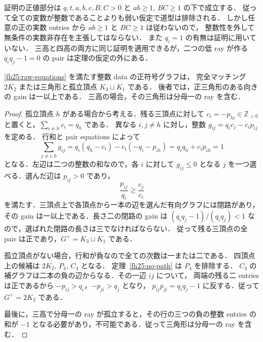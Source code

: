\begin{remark}[排除に必要な離散性]
\label{fh25:real-scope}
証明の正値部分は $q,t,a,b,c,B,C>0$ と $ab\ge1$, $BC\ge1$ の下で成立する．
従って全ての変数が整数であることよりも弱い仮定で道型は排除される．
しかし任意の正の実数 entries から $ab\ge1$ と $BC\ge1$ は従わないので，
整数性を外して無条件の実数非存在を主張してはならない．
また $q_i=1$ の有無は証明に用いていない．
三高と四高の両方に同じ証明を適用できるが，二つの低 ray が作る
$q_iq_j-1=0$ の pair は定理の仮定の外にある．
\end{remark}

\begin{theorem}
\label{fh25:all-signs}
\eqref{fh25:raw-equations} を満たす整数 data の正符号グラフは，
完全マッチング $2K_2$ または三角形と孤立頂点 $K_3\sqcup K_1$ である．
後者では，正三角形のある向きの gain は一以上である．
三高の場合，その三角形は分母一の ray を含む．
\end{theorem}

\begin{proof}
孤立頂点 $h$ がある場合から考える．残る三頂点に対して
$c_i=-p_{hi}\in\mathbb Z_{>0}$ と置くと，$\sum_{i\ne h}c_i=q_h$ である．
異なる $i,j\ne h$ に対し，整数 $g_{ij}=q_i c_j-c_i p_{ij}$ を定める．
行和と pair equations によって
\[
 \sum_{j\ne i,h}g_{ij}
 =q_i(q_h-c_i)-c_i(-q_i-p_{ih})
 =q_iq_h+c_i p_{ih}=1
\]
となる．左辺は二つの整数の和なので，各 $i$ に対して $g_{ij}\le0$ となる
$j$ を一つ選べる．選んだ辺は $p_{ij}>0$ であり，
\[
 \frac{p_{ij}}{q_i}\ge\frac{c_j}{c_i}
\]
を満たす．三頂点上で各頂点から一本の辺を選んだ有向グラフには閉路があり，
その gain は一以上である．長さ二の閉路の gain は
$(q_iq_j-1)/(q_iq_j)<1$ なので，選ばれた閉路の長さは三でなければならない．
従って残る三頂点の全 pair は正であり，$G^+=K_3\sqcup K_1$ である．

孤立頂点がない場合，行和が負なので全ての次数は一または二である．
四頂点上の候補は $2K_2$, $P_4$, $C_4$ となる．
定理~\ref{fh25:no-path} は $P_4$ を排除する．
$C_4$ の補グラフは二本の負の辺からなる．その一辺 $ij$ について，
両端の残る二 entries は正であるから $-p_{ij}>q_i$，$-p_{ji}>q_j$ となり，
$p_{ij}p_{ji}=q_iq_j-1$ に反する．従って $G^+=2K_2$ である．

最後に，三高で分母一の ray が孤立すると，その行の三つの負の整数 entries
の和が $-1$ となる必要があり，不可能である．従って三角形は分母一の ray を含む．
\end{proof}

